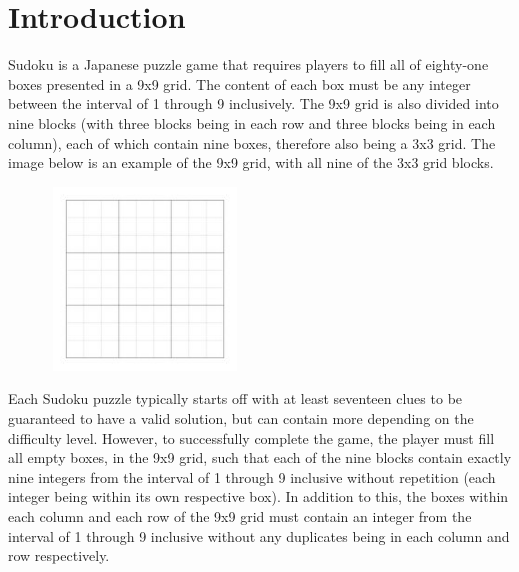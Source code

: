 \documentclass[conference]{IEEEtran}
\begin{document}
\vspace{1\baselineskip}

\section{Introduction}
Sudoku is a Japanese puzzle game that requires players to fill all of eighty-one boxes presented in a 9x9 grid. The content of each box must be any integer between the interval of 1 through 9 inclusively. The 9x9 grid is also divided into nine blocks (with three blocks being in each row and three blocks being in each column), each of which contain nine boxes, therefore also being a 3x3 grid. The image below is an example of the 9x9 grid, with all nine of the 3x3 grid blocks.

\vspace{1\baselineskip}
\begin{figure}[H]
\centering
\includegraphics[width=5.11cm,height=4.87cm]{sudokujpg.jpg}
\end{figure}

\vspace{1\baselineskip}
Each Sudoku puzzle typically starts off with at least seventeen clues to be guaranteed to have a valid solution, but can contain more depending on the difficulty level. However, to successfully complete the game, the player must fill all empty boxes, in the 9x9 grid, such that each of the nine blocks contain exactly nine integers from the interval of 1 through 9 inclusive without repetition (each integer being within its own respective box). In addition to this, the boxes within each column and each row of the 9x9 grid must contain an integer from the interval of 1 through 9 inclusive without any duplicates being in each column and row respectively. 

\vspace{1\baselineskip}
\end{document}
